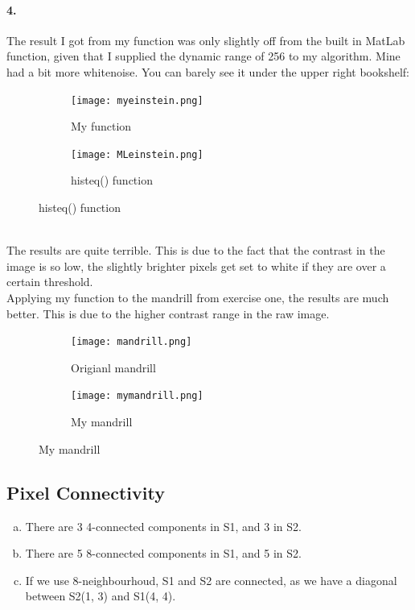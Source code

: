 \documentclass{article}
\begin{document}
\paragraph{4.}
The result I got from my function was only slightly off from the built in MatLab function, given that I supplied the dynamic range of 256 to my algorithm. Mine had a bit more whitenoise. You can barely see it under the upper right bookshelf:
\begin{figure}[ht!]
	\centering
	\begin{subfigure}[t]{0.49\textwidth}
		\texttt{[image: myeinstein.png]}
		\caption{My function}
		\label{fig:myeinstein.png}
	\end{subfigure}
	\begin{subfigure}[t]{0.49\textwidth}
		\texttt{[image: MLeinstein.png]}
		\caption{histeq() function}
		\label{fig:MLeinstein.png}
	\end{subfigure}
\end{figure}
\\
The results are quite terrible. This is due to the fact that the contrast in the image is so low, the slightly brighter pixels get set to white if they are over a certain threshold.
\\
Applying my function to the mandrill from exercise one, the results are much better. This is due to the higher contrast range in the raw image.
\begin{figure}[ht!]
	\centering
	\begin{subfigure}[t]{0.49\textwidth}
		\texttt{[image: mandrill.png]}
		\caption{Origianl mandrill}
		\label{fig:mandrill.png}
	\end{subfigure}
	\begin{subfigure}[t]{0.49\textwidth}
		\texttt{[image: mymandrill.png]}
		\caption{My mandrill}
		\label{fig:mymandrill.png}
	\end{subfigure}
\end{figure}

\subsection{Pixel Connectivity}
\begin{enumerate}[(a)]
	\item There are 3 4-connected components in S1, and 3 in S2.
	\item There are 5 8-connected components in S1, and 5 in S2.
	\item If we use 8-neighbourhoud, S1 and S2 are connected, as we have a diagonal between S2(1, 3) and S1(4, 4).
\end{enumerate}
\end{document}
